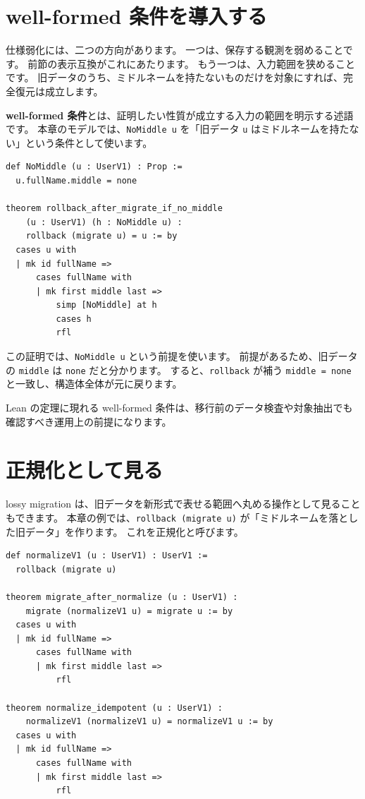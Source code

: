 \section{well-formed 条件を導入する}

仕様弱化には、二つの方向があります。
一つは、保存する観測を弱めることです。
前節の表示互換がこれにあたります。
もう一つは、入力範囲を狭めることです。
旧データのうち、ミドルネームを持たないものだけを対象にすれば、完全復元は成立します。

\textbf{well-formed 条件}とは、証明したい性質が成立する入力の範囲を明示する述語です。
本章のモデルでは、\texttt{NoMiddle u} を「旧データ \texttt{u} はミドルネームを持たない」という条件として使います。

\begin{listing}[htbp]
\begin{verbatim}
def NoMiddle (u : UserV1) : Prop :=
  u.fullName.middle = none

theorem rollback_after_migrate_if_no_middle
    (u : UserV1) (h : NoMiddle u) :
    rollback (migrate u) = u := by
  cases u with
  | mk id fullName =>
      cases fullName with
      | mk first middle last =>
          simp [NoMiddle] at h
          cases h
          rfl
\end{verbatim}
\caption{\texttt{rollback\_after\_migrate\_if\_no\_middle}}
\label{lst:ch29-wellformed}
\end{listing}

この証明では、\texttt{NoMiddle u} という前提を使います。
前提があるため、旧データの \texttt{middle} は \texttt{none} だと分かります。
すると、\texttt{rollback} が補う \texttt{middle = none} と一致し、構造体全体が元に戻ります。

Lean の定理に現れる well-formed 条件は、移行前のデータ検査や対象抽出でも確認すべき運用上の前提になります。

\section{正規化として見る}

lossy migration は、旧データを新形式で表せる範囲へ丸める操作として見ることもできます。
本章の例では、\texttt{rollback (migrate u)} が「ミドルネームを落とした旧データ」を作ります。
これを正規化と呼びます。

\begin{listing}[htbp]
\begin{verbatim}
def normalizeV1 (u : UserV1) : UserV1 :=
  rollback (migrate u)

theorem migrate_after_normalize (u : UserV1) :
    migrate (normalizeV1 u) = migrate u := by
  cases u with
  | mk id fullName =>
      cases fullName with
      | mk first middle last =>
          rfl

theorem normalize_idempotent (u : UserV1) :
    normalizeV1 (normalizeV1 u) = normalizeV1 u := by
  cases u with
  | mk id fullName =>
      cases fullName with
      | mk first middle last =>
          rfl
\end{verbatim}
\caption{\texttt{normalizeV1}}
\label{lst:ch29-normalize}
\end{listing}


